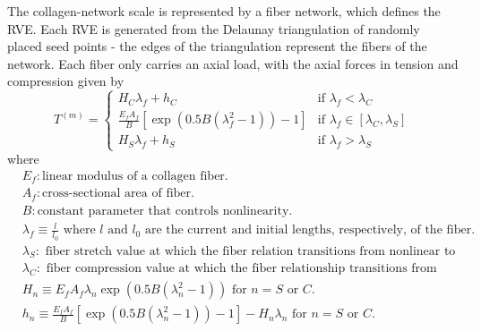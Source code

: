 \documentclass[]{interact}
\begin{document}
The collagen-network scale is represented by a fiber network, which defines the RVE. Each RVE is generated from the Delaunay triangulation of randomly placed seed points - the edges of the triangulation represent the fibers of the network. Each fiber only carries an axial load, with the axial forces in tension and compression given by 
\begin{equation}
T^{(m)} =
\begin{cases}
H_C  \lambda_f + h_C & \text{if } \lambda_f < \lambda_C \\
\frac{E_f A_f}{B} \left[ \exp(0.5 B(\lambda_f^2 - 1)) - 1\right] & \text{if } \lambda_f \in [\lambda_C, \lambda_S] \\
H_S \lambda_f + h_S & \text{if } \lambda_f > \lambda_S
\end{cases}
\label{eq:fiber_force}
\end{equation}
%
where 
%
\begin{align*}
&E_f: \text{linear modulus of a collagen fiber.} \\
&A_f: \text{cross-sectional area of fiber.} \\
&B: \text{constant parameter that controls nonlinearity.} \\
&\lambda_f \equiv \frac{l}{l_0} \text{ where } l \text{ and } l_0 \text{ are the current and initial lengths, respectively, of the fiber. } \\
&\lambda_S: \text{ fiber stretch value at which the fiber relation transitions from nonlinear to linear.} \\
&\lambda_C: \text{ fiber compression value at which the fiber relationship transitions from nonlinear to linear.} \\
&H_n \equiv E_f A_f\lambda_n \exp(0.5B(\lambda_n^2 - 1)) \text{ for } n=S \text{ or } C.\nonumber\\
&h_n \equiv \frac{E_f A_f}{B}\left[\exp(0.5 B (\lambda_n^2-1))-1\right] -H_n \lambda_n \text{ for } n=S \text{ or } C. 
\end{align*}
%
\end{document}
